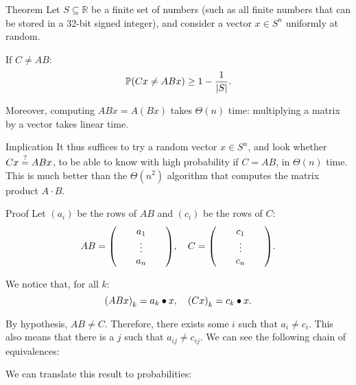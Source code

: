 \documentclass[a4paper]{article}
\begin{document}
\begin{parag}{Theorem}
    Let $S \subseteq \mathbb{R}$ be a finite set of numbers (such as all finite numbers that can be stored in a 32-bit signed integer), and consider a vector $x \in S^{n}$ uniformly at random.

    If $C \neq AB$:
    \[\prob\left(Cx \neq ABx\right) \geq 1 - \frac{1}{\left|S\right|}.\]

    Moreover, computing $ABx = A\left(Bx\right)$ takes $\Theta\left(n\right)$ time: multiplying a matrix by a vector takes linear time.

    \begin{subparag}{Implication}
        It thus suffices to try a random vector $x \in S^n$, and look whether $Cx \over{=}{?}  ABx$, to be able to know with high probability if $C = AB$, in $\Theta\left(n\right)$ time. This is much better than the $\Theta\left(n^2\right)$ algorithm that computes the matrix product $A\cdot B$.
    \end{subparag}

    \begin{subparag}{Proof}
        Let $\left(a_i\right)$ be the rows of $AB$ and $\left(c_i\right)$ be the rows of $C$: 
        \[AB = \begin{pmatrix}  &  & a_1 &  &  \\  &  & \vdots &  &  \\  &  & a_n &  &  \end{pmatrix}, \mathspace C = \begin{pmatrix}  &  & c_1 &  &  \\  &  & \vdots &  &  \\  &  & c_n &  &  \end{pmatrix}.\]

        We notice that, for all $k$: 
        \[\left(ABx\right)_k = a_k \dotprod x, \mathspace \left(C x\right)_k = c_k \dotprod x.\]

        By hypothesis, $AB \neq C$. Therefore, there exists some $i$ such that $a_i \neq c_i$. This also means that there is a $j$ such that $a_{ij} \neq c_{ij}$. We can see the following chain of equivalences:
         
        We can translate this result to probabilities:


\end{subparag}
\end{parag}
\end{document}
